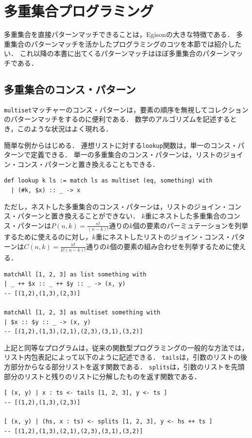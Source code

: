 \section{多重集合プログラミング}

多重集合を直接パターンマッチできることは，Egisonの大きな特徴である．
多重集合のパターンマッチを活かしたプログラミングのコツを本節では紹介したい．
これ以降の本書に出てくるパターンマッチはほぼ多重集合のパターンマッチである．

\subsection{多重集合のコンス・パターン}

\lstinline{multiset}マッチャーのコンス・パターンは，要素の順序を無視してコレクションのパターンマッチをするのに便利である．
数学のアルゴリズムを記述するとき，このような状況はよく現れる．

簡単な例からはじめる．
連想リストに対する\lstinline{lookup}関数は，単一のコンス・パターンで定義できる．
単一の多重集合のコンス・パターンは，リストのジョイン・コンス・パターンと置き換えることもできる．
\begin{lstlisting}[language=egison,numbers=none]
def lookup k ls := match ls as multiset (eq, something) with
  | (#k, $x) :: _ -> x
\end{lstlisting}
ただし，ネストした多重集合のコンス・パターンは，リストのジョイン・コンス・パターンと置き換えることができない．
$k$重にネストした多重集合のコンス・パターンは$P(n,k) = \frac{n!}{(n-k)!}$通りの$k$個の要素のパーミュテーションを列挙するために使えるのに対し，$k$重にネストしたリストのジョイン・コンス・パターンは$C(n,k) = \frac{n!}{k!(n-k)!}$通りの$k$個の要素の組み合わせを列挙するために使える．
\begin{lstlisting}[language=egison,numbers=none]
matchAll [1, 2, 3] as list something with
| _ ++ $x :: _ ++ $y :: _ -> (x, y)
-- [(1,2),(1,3),(2,3)]

matchAll [1, 2, 3] as multiset something with
| $x :: $y :: _ -> (x, y)
-- [(1,2),(1,3),(2,1),(2,3),(3,1),(3,2)]
\end{lstlisting}
上記と同等なプログラムは，従来の関数型プログラミングの一般的な方法では，リスト内包表記によって以下のように記述できる．
\lstinline{tails}は，引数のリストの後方部分からなる部分リストを返す関数である．
\lstinline{splits}は，引数のリストを先頭部分のリストと残りのリストに分解したものを返す関数である．
\begin{lstlisting}[language=egison,numbers=none]
[ (x, y) | x : ts <- tails [1, 2, 3], y <- ts ]
-- [(1,2),(1,3),(2,3)]

[ (x, y) | (hs, x : ts) <- splits [1, 2, 3], y <- hs ++ ts ]
-- [(1,2),(1,3),(2,1),(2,3),(3,1),(3,2)]
\end{lstlisting}

